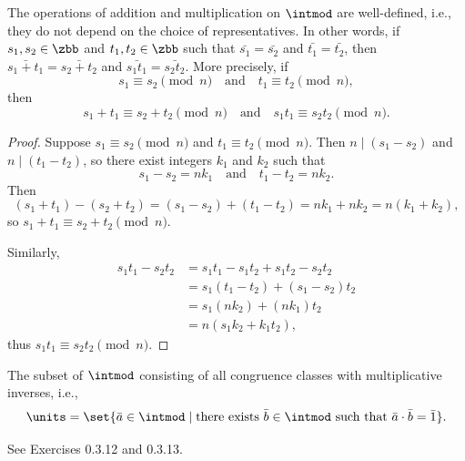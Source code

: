 \begin{theorem}
    The operations of addition and multiplication on $\intmod$ are well-defined, i.e., they do not depend on the choice of representatives.
    In other words, if $s_1, s_2 \in \zbb$ and $t_1, t_2 \in \zbb$ such that $\bar{s_1} = \bar{s_2}$ and $\bar{t_1} = \bar{t_2}$, then $\bar{s_1 + t_1} = \bar{s_2 + t_2}$ and $\bar{s_1 t_1} = \bar{s_2 t_2}$.
    More precisely, if
    \[
        s_1 \equiv s_2 \pmod{n} \quad \text{and} \quad t_1 \equiv t_2 \pmod{n},
    \]
    then
    \[
        s_1 + t_1 \equiv s_2 + t_2 \pmod{n} \quad \text{and} \quad s_1 t_1 \equiv s_2 t_2 \pmod{n}.
    \]
\end{theorem}

\begin{proof}
    Suppose $s_1 \equiv s_2 \pmod{n}$ and $t_1 \equiv t_2 \pmod{n}$. Then $n \mid (s_1 - s_2)$ and $n \mid (t_1 - t_2)$, so there exist integers $k_1$ and $k_2$ such that
    \[
        s_1 - s_2 = nk_1 \quad \text{and} \quad t_1 - t_2 = nk_2.
    \]
    Then
    \[
        (s_1 + t_1) - (s_2 + t_2) = (s_1 - s_2) + (t_1 - t_2) = nk_1 + nk_2 = n(k_1 + k_2),
    \]
    so $s_1 + t_1 \equiv s_2 + t_2 \pmod{n}$.

    Similarly,
    \begin{align*}
        s_1 t_1 - s_2 t_2 &= s_1 t_1 - s_1 t_2 + s_1 t_2 - s_2 t_2 \\
        &= s_1(t_1 - t_2) + (s_1 - s_2)t_2 \\
        &= s_1(nk_2) + (nk_1)t_2 \\
        &= n(s_1 k_2 + k_1 t_2),
    \end{align*}
    thus $s_1 t_1 \equiv s_2 t_2 \pmod{n}$.
\end{proof}

 The subset of $\intmod$ consisting of all congruence classes with  multiplicative inverses, i.e.,
\[
    \units = \set{\bar a \in \intmod \mid \text{there exists } \bar b \in \intmod \text{ such that } \bar a \cdot \bar b = \bar 1}.
\]

\begin{proposition}[{$\units = \set{\bar a \in \intmod \mid (a, n) = 1}$}]
    See Exercises 0.3.12 and 0.3.13.
\end{proposition}